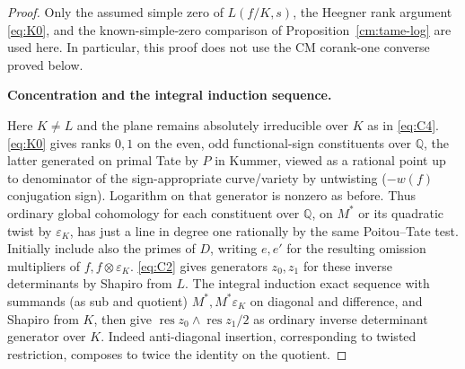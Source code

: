\begin{proof}
Only the assumed simple zero of \(L(f/K,s)\), the Heegner rank
argument \eqref{eq:K0}, and the known-simple-zero comparison
of Proposition~\ref{cm:tame-log} are used here. In particular,
this proof does not use the CM corank-one converse proved below.

\par\smallskip\noindent\textbf{Concentration and the integral induction sequence.}\enspace

Here \(K\ne L\) and the plane remains absolutely irreducible over \(K\) as in \eqref{eq:C4}.
\eqref{eq:K0} gives ranks \(0,1\) on the even, odd functional-sign constituents over \(\mathbb
Q\), the latter generated on primal Tate by \(P\) in Kummer, viewed as a rational point up to
denominator of the sign-appropriate curve/variety by untwisting (\(-w(f)\) conjugation sign).
Logarithm on that generator is nonzero as before. Thus ordinary global cohomology for each
constituent over \(\mathbb Q\), on \(M^*\) or its quadratic twist by \(\varepsilon_K\), has
just a line in degree one rationally by the same Poitou--Tate test. Initially include also the
primes of \(D\), writing \(e,e'\) for the resulting omission multipliers of
\(f,f\otimes\varepsilon_K\). \eqref{eq:C2} gives generators \(z_0,z_1\) for these inverse
determinants by Shapiro from \(L\). The integral induction exact sequence with summands (as
sub and quotient) \(M^*,M^*\varepsilon_K\) on diagonal and difference, and Shapiro from \(K\),
then give
\(\operatorname{res} z_0\wedge\operatorname{res} z_1/2\) as ordinary inverse determinant
generator over \(K\). Indeed anti-diagonal insertion, corresponding to twisted restriction,
composes to twice the identity on the quotient.


\end{proof}
